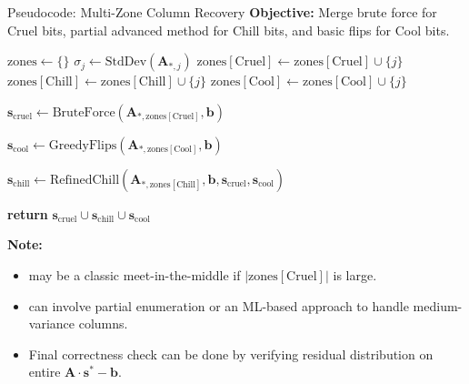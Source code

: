 \documentclass{beamer}
\begin{document}
\begin{frame}[fragile]{Pseudocode: Multi-Zone Column Recovery}
\small
\textbf{Objective:} Merge brute force for Cruel bits, partial advanced method for Chill bits, and basic flips for Cool bits.

\begin{algorithmic}
  \State $\text{zones} \gets \{\}$ 
    \State $\sigma_j \gets \mathrm{StdDev}(\mathbf{A}_{*,j})$ 
      \State $\text{zones}[\mathrm{Cruel}] \gets \text{zones}[\mathrm{Cruel}] \cup \{j\}$
      \State $\text{zones}[\mathrm{Chill}] \gets \text{zones}[\mathrm{Chill}] \cup \{j\}$
    \Else
      \State $\text{zones}[\mathrm{Cool}] \gets \text{zones}[\mathrm{Cool}] \cup \{j\}$
    \EndIf
  \EndFor

  \State $\mathbf{s}_{\mathrm{cruel}} \gets \mathrm{BruteForce}(\mathbf{A}_{*,\text{zones}[\mathrm{Cruel}]}, \mathbf{b})$

  \State $\mathbf{s}_{\mathrm{cool}} \gets \mathrm{GreedyFlips}(\mathbf{A}_{*,\text{zones}[\mathrm{Cool}]}, \mathbf{b})$

  \State $\mathbf{s}_{\mathrm{chill}} \gets \mathrm{RefinedChill}(\mathbf{A}_{*,\text{zones}[\mathrm{Chill}]}, \mathbf{b}, \mathbf{s}_{\mathrm{cruel}}, \mathbf{s}_{\mathrm{cool}})$

  \State \textbf{return} $\mathbf{s}_{\mathrm{cruel}} \cup \mathbf{s}_{\mathrm{chill}} \cup \mathbf{s}_{\mathrm{cool}}$
\EndProcedure
\end{algorithmic}

\textbf{Note:}
\begin{itemize}
  \item {} may be a classic meet-in-the-middle if $|\text{zones}[\mathrm{Cruel}]|$ is large.
  \item {} can involve partial enumeration or an ML-based approach to handle medium-variance columns.
  \item Final correctness check can be done by verifying residual distribution on entire $\mathbf{A} \cdot \mathbf{s}^* - \mathbf{b}$.
\end{itemize}
\end{frame}
\end{document}
